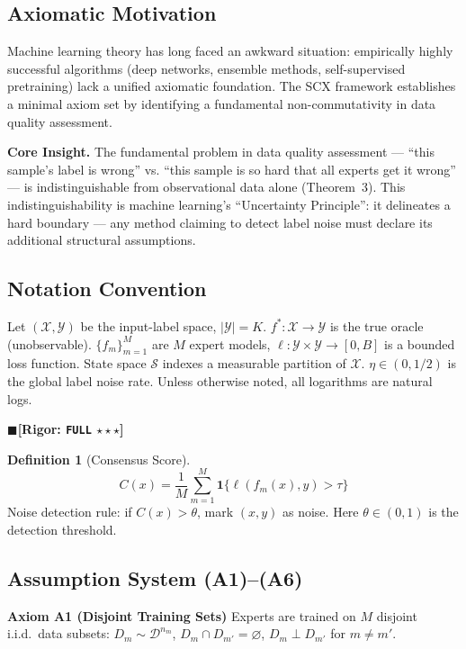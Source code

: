 \documentclass[12pt,a4paper]{article}
\theoremstyle{definition}
\newtheorem{definition}{Definition}[section]
\theoremstyle{remark}
\newcommand{\rigorFull}{$\blacksquare$\;\textbf{[Rigor: \texttt{FULL} $\star\star\star$]}}
\begin{document}
\subsection{Axiomatic Motivation}
Machine learning theory has long faced an awkward situation: empirically highly successful algorithms (deep networks, ensemble methods, self-supervised pretraining) lack a unified axiomatic foundation. The SCX framework establishes a minimal axiom set by identifying a fundamental non-commutativity in data quality assessment.

\textbf{Core Insight.} The fundamental problem in data quality assessment --- ``this sample's label is wrong'' vs. ``this sample is so hard that all experts get it wrong'' --- is indistinguishable from observational data alone (Theorem~3). This indistinguishability is machine learning's ``Uncertainty Principle'': it delineates a hard boundary — any method claiming to detect label noise must declare its additional structural assumptions.

\subsection{Notation Convention}

Let $(\mathcal{X}, \mathcal{Y})$ be the input-label space, $|\mathcal{Y}| = K$. $f^*: \mathcal{X} \to \mathcal{Y}$ is the true oracle (unobservable). $\{f_m\}_{m=1}^M$ are $M$ expert models, $\ell: \mathcal{Y} \times \mathcal{Y} \to [0, B]$ is a bounded loss function. State space $\mathcal{S}$ indexes a measurable partition of $\mathcal{X}$. $\eta \in (0, 1/2)$ is the global label noise rate. Unless otherwise noted, all logarithms are natural logs.

\rigorFull

\begin{definition}[Consensus Score]
\begin{equation}
C(x) = \frac{1}{M}\sum_{m=1}^{M} \mathbf{1}\{\ell(f_m(x), y) > \tau\}
\end{equation}
Noise detection rule: if $C(x) > \theta$, mark $(x, y)$ as noise. Here $\theta \in (0, 1)$ is the detection threshold.
\end{definition}

\subsection{Assumption System (A1)--(A6)}

\textbf{Axiom A1 (Disjoint Training Sets)} Experts are trained on $M$ disjoint i.i.d.\ data subsets: $D_m \sim \mathcal{D}^{n_m}$, $D_m \cap D_{m'} = \varnothing$, $D_m \perp D_{m'}$ for $m \neq m'$.
\end{document}
